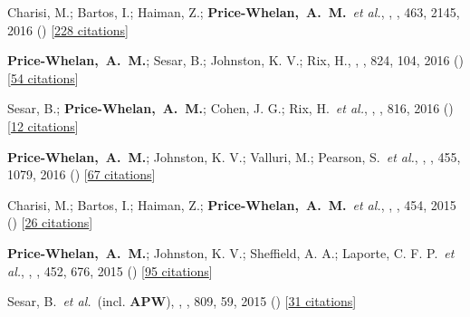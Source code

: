 {\item[{\color{deemph}\scriptsize23}]Charisi, M.; Bartos, I.; Haiman, Z.; \textbf{Price-Whelan,~A.~M.}~\textit{et al.}, , \mnras, 463, 2145, 2016 () [\href{http://adsabs.harvard.edu/abs/2016MNRAS.463.2145C}{228 citations}]

\item[{\color{deemph}\scriptsize22}]\textbf{Price-Whelan,~A.~M.}; Sesar, B.; Johnston, K. V.; Rix, H., , \apj, 824, 104, 2016 () [\href{http://adsabs.harvard.edu/abs/2016ApJ...824..104P}{54 citations}]

\item[{\color{deemph}\scriptsize21}]Sesar, B.; \textbf{Price-Whelan,~A.~M.}; Cohen, J. G.; Rix, H.~\textit{et al.}, , \apj, 816, 2016 () [\href{http://adsabs.harvard.edu/abs/2016ApJ...816L...4S}{12 citations}]

\item[{\color{deemph}\scriptsize20}]\textbf{Price-Whelan,~A.~M.}; Johnston, K. V.; Valluri, M.; Pearson, S.~\textit{et al.}, , \mnras, 455, 1079, 2016 () [\href{http://adsabs.harvard.edu/abs/2016MNRAS.455.1079P}{67 citations}]

\item[{\color{deemph}\scriptsize19}]Charisi, M.; Bartos, I.; Haiman, Z.; \textbf{Price-Whelan,~A.~M.}~\textit{et al.}, , \mnras, 454, 2015 () [\href{http://adsabs.harvard.edu/abs/2015MNRAS.454L..21C}{26 citations}]

\item[{\color{deemph}\scriptsize18}]\textbf{Price-Whelan,~A.~M.}; Johnston, K. V.; Sheffield, A. A.; Laporte, C. F. P.~\textit{et al.}, , \mnras, 452, 676, 2015 () [\href{http://adsabs.harvard.edu/abs/2015MNRAS.452..676P}{95 citations}]

\item[{\color{deemph}\scriptsize17}]Sesar, B.~\textit{et al.}~(incl. \textbf{APW}), , \apj, 809, 59, 2015 () [\href{http://adsabs.harvard.edu/abs/2015ApJ...809...59S}{31 citations}]

}

